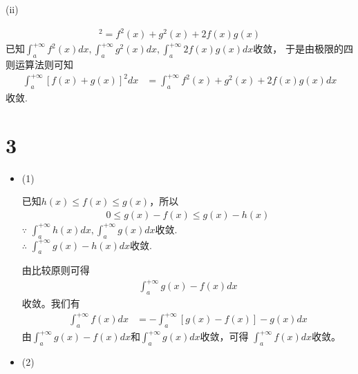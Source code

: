 \documentclass{article}
\begin{document}
(ii)

\begin{align*}
  [f(x) + g(x)]^2 = f^2(x) + g^2(x) + 2 f(x) g(x)
\end{align*}
已知$\int_{a}^{+\infty} f^2(x) dx, \int_{a}^{+\infty} g^2(x) dx, \int_{a}^{+\infty} 2 f(x) g(x) dx$收敛，
于是由极限的四则运算法则可知
\begin{align*}
  \int_{a}^{+\infty} [f(x) + g(x)]^2 dx
   & = \int_{a}^{+\infty} f^2(x) + g^2(x) + 2 f(x) g(x) dx
\end{align*}
收敛.

\section*{3}

\begin{itemize}
  \item (1)

        已知$h(x) \leq f(x) \leq g(x)$，所以
        \begin{align*}
          0 \leq g(x) - f(x) \leq g(x) - h(x)
        \end{align*}
        $\because$ $\int_{a}^{+\infty} h(x) dx, \int_{a}^{+\infty} g(x) dx$收敛.\\
        $\therefore$ $\int_{a}^{+\infty} g(x) - h(x) dx$收敛.

        由比较原则可得
        \begin{align*}
          \int_{a}^{+\infty} g(x) - f(x) dx
        \end{align*}
        收敛。我们有
        \begin{align*}
          \int_{a}^{+\infty} f(x) dx & =  - \int_{a}^{+\infty} [g(x) - f(x)] - g(x) dx
        \end{align*}
        由$\int_{a}^{+\infty} g(x) - f(x) dx$和$\int_{a}^{+\infty} g(x) dx$收敛，可得
        $\int_{a}^{+\infty} f(x) dx $收敛。

  \item (2)


\end{itemize}
\end{document}
